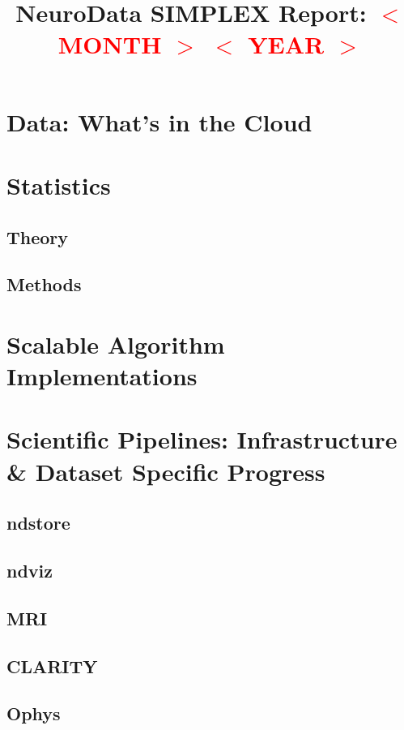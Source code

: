 \documentclass[12pt]{article}
\title{NeuroData SIMPLEX Report:\textcolor{red}{ $<$ MONTH $>$ $<$ YEAR
    $>$}}
\begin{document}

\newpage


\section{Data: What's in the Cloud}

\section{Statistics} 

\subsection{Theory} 

\subsection{Methods}


\section{Scalable Algorithm Implementations}


\section{Scientific Pipelines: Infrastructure \& Dataset Specific
  Progress}

\subsection{ndstore}
\subsection{ndviz}
\subsection{MRI}
\subsection{CLARITY}
\subsection{Ophys}






\end{document}
